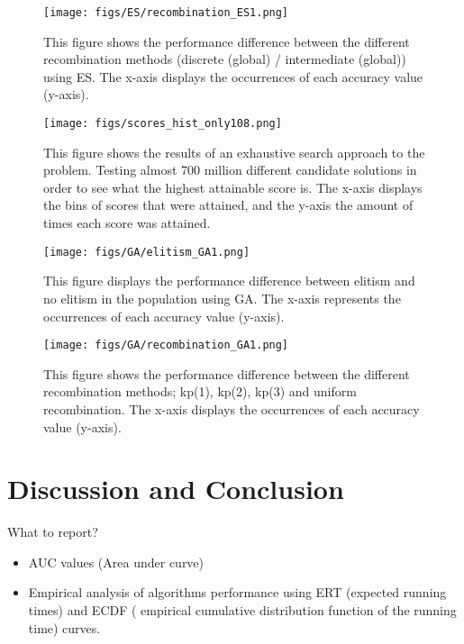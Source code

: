 \documentclass{article}
\begin{document}
\begin{figure}[H]
    \centering
    \texttt{[image: figs/ES/recombination\_ES1.png]}
    \caption{
    This figure shows the performance difference between the different recombination methods (discrete (global) / intermediate (global)) using ES.
    The x-axis displays the occurrences of each accuracy value (y-axis). }
    \label{fig:ES_recombination}
\end{figure}

\begin{figure}[H]
    \centering
    \texttt{[image: figs/scores\_hist\_only108.png]}
    \caption{
    This figure shows the results of an exhaustive search approach to the problem.
    Testing almost 700 million different candidate solutions in order to see what the highest attainable score is.
    The x-axis displays the bins of scores that were attained, and the y-axis the amount of times each score was attained.
    }
    \label{fig:Brute-force}
\end{figure}

\begin{figure}[H]
    \centering
    \texttt{[image: figs/GA/elitism\_GA1.png]}
    \caption{
    This figure displays the performance difference between elitism and no elitism in the population using GA.
    The x-axis represents the occurrences of each accuracy value (y-axis). }
    \label{fig:GA_elitism}
\end{figure}

\begin{figure}[H]
    \centering
    \texttt{[image: figs/GA/recombination\_GA1.png]}
    \caption{
    This figure shows the performance difference between the different recombination methods;
    kp(1), kp(2), kp(3) and uniform recombination. 
    The x-axis displays the occurrences of each accuracy value (y-axis). }
    \label{fig:GA_recombination}
\end{figure}






\section{Discussion and Conclusion}\label{sec:dis&res}

What to report? 
\begin{itemize}
    \item AUC values (Area under curve) 
    \item Empirical analysis of algorithms performance using ERT (expected running times) and ECDF ( empirical cumulative distribution function of the running time) curves. 
\end{itemize}
\end{document}
